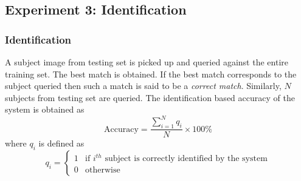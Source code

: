 \documentclass{beamer}
\begin{document}
\subsection{Experiment 3: Identification}
\begin{frame}
\frametitle{Identification}
A subject image from testing set is picked up and queried against the entire training set. The best match is obtained. If the best match corresponds to the subject queried then such a match is said to be a \emph{correct match}. Similarly, $N$ subjects from testing set are queried. The identification based accuracy of the system is obtained as
\begin{equation}
  \text{Accuracy} = \frac{\sum_{i=1}^{N} q_i}{N} \times 100\%
\end{equation}
where $q_i$ is defined as
\begin{equation}
q_i = 
  \begin{cases} 1 & \text{if } i^{th} \text{ subject is correctly identified by the system}\\0 & \text{otherwise} \end{cases}
\end{equation}
\end{frame}
\end{document}
